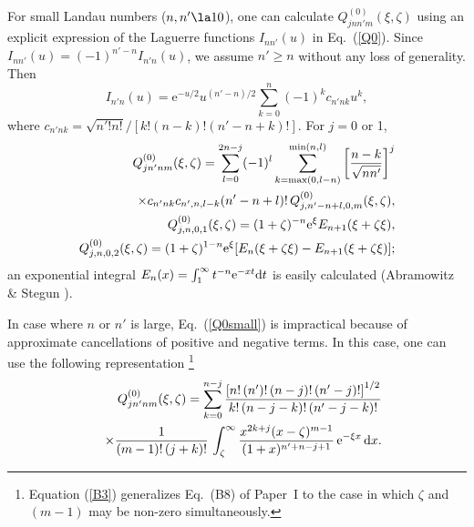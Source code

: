\documentclass{aa}
\newcommand{\beq}{\begin{equation}}
\newcommand{\eeq}{\end{equation}}
\newcommand{\req}[1]{Eq.~(\ref{#1})}
\begin{document}
{{For small Landau numbers ($n,n'\la10$),
one can calculate $Q^{(0)}_{jnn'm}(\xi,\zeta)$
using an explicit expression of the Laguerre functions
$I_{nn'}(u)$ in \req{Q0}.
Since $I_{nn'}(u)=(-1)^{n'-n} I_{n'n}(u)$,
we assume $n'\geq n$ without any loss of generality.
Then
\beq
   I_{n'n}(u) = \mathrm{e}^{-u/2} u^{(n'-n)/2}
       \sum_{k=0}^n (-1)^k c_{n'nk} u^k,
\eeq
where $c_{n'nk} = \sqrt{n'!n!}/[ k!(n-k)!(n'-n+k)!]$.
For $j=0$ or 1,
\begin{eqnarray}
&&\hspace*{-.9em}
   Q^{(0)}_{jn'nm}(\xi,\zeta) = \sum_{l=0}^{2n-j} (-1)^l
          \sum_{k={\rm max}(0,l-n)}^{{\rm min}(n,l)}
        \left[ {n-k \over \sqrt{nn'} } \right]^j
\nonumber\\&&\times
             c_{n'nk} c_{n',n,l-k}
            (n'-n+l)! \, Q^{(0)}_{j,n'-n+l,0,m}(\xi,\zeta),
\label{Q0small}
\\&&\hspace*{-.9em}
   Q^{(0)}_{j,n,0,1}(\xi,\zeta) = (1+\zeta)^{-n}
          \mathrm{e}^\xi E_{n+1}(\xi+\zeta\xi),
\nonumber
\\&&\hspace*{-.9em}
   Q^{(0)}_{j,n,0,2}(\xi,\zeta) = (1+\zeta)^{1-n}
          \mathrm{e}^\xi
             [E_n(\xi+\zeta\xi)-E_{n+1}(\xi+\zeta\xi) ];
\nonumber
\end{eqnarray}
an exponential integral
$E_n(x)=\int_1^\infty t^{-n}\mathrm{e}^{-xt}{\rm d}t$
is easily calculated (Abramowitz \& Stegun \cite{Abramowitz}).

In case where $n$ or $n'$ is large, \req{Q0small} is impractical
because of approximate cancellations of positive and negative terms.
In this case, one can use the following representation%
\footnote{Equation (\ref{B3}) generalizes
Eq.~(B8) of Paper~I to the case in which $\zeta$ and $(m-1)$
may be non-zero simultaneously.}
\begin{eqnarray}
   && \hspace*{-.9em}
   Q^{(0)}_{jn'nm}(\xi,\zeta) = \sum_{k=0}^{n-j}
   {\left[n!\,(n')!\,(n-j)!\,(n'-j)!\right]^{1/2} \over
   k!\,(n-j-k)!\,(n'-j-k)!}
\nonumber\\
   && \times {1\over(m-1)!\,(j+k)!}\,
   \int_\zeta^\infty {x^{2k+j}(x-\zeta)^{m-1}\over (1+x)^{n'+n-j+1}}\,
   \mathrm{e}^{-\xi x}\,{\rm d}x .
\label{B3}
\end{eqnarray}

}}
\end{document}
